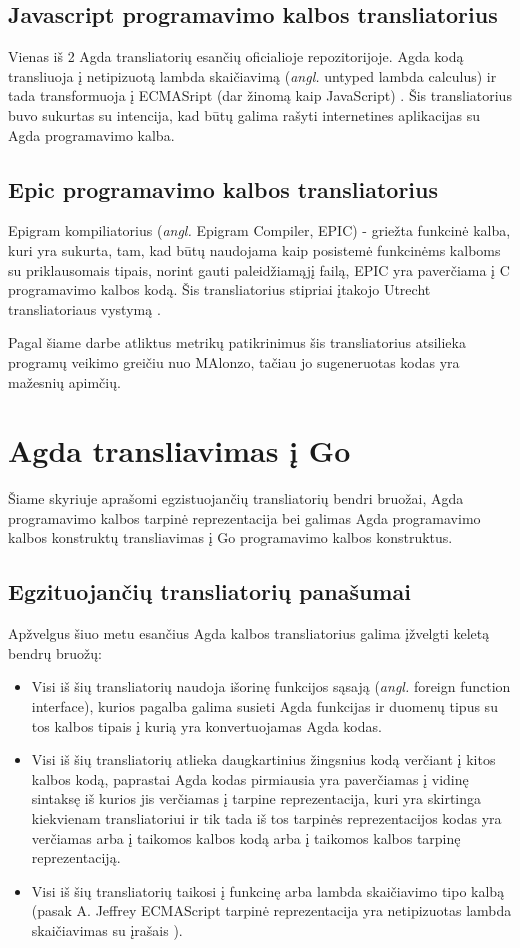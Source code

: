 \documentclass{VUMIFPSbakalaurinis}
\begin{document}
\subsection{Javascript programavimo kalbos transliatorius}
Vienas iš 2 Agda transliatorių esančių oficialioje repozitorijoje. Agda kodą transliuoja į netipizuotą lambda skaičiavimą (\textit{angl.} untyped lambda calculus) ir tada transformuoja į ECMASript (dar žinomą kaip JavaScript) \cite{html_agda}. Šis transliatorius buvo sukurtas su intencija, kad būtų galima rašyti internetines aplikacijas su Agda programavimo kalba.
\subsection{Epic programavimo kalbos transliatorius}
Epigram kompiliatorius (\textit{angl.} Epigram Compiler, EPIC) - griežta funkcinė kalba, kuri yra sukurta, tam, kad būtų naudojama kaip posistemė funkcinėms kalboms su priklausomais tipais, norint gauti paleidžiamąjį failą, EPIC yra paverčiama į C programavimo kalbos kodą. Šis transliatorius stipriai įtakojo Utrecht transliatoriaus vystymą \cite{Utrecht}.\par Pagal šiame darbe atliktus metrikų patikrinimus šis transliatorius atsilieka programų veikimo greičiu nuo MAlonzo, tačiau jo sugeneruotas kodas yra mažesnių apimčių. 
\section{Agda transliavimas į Go}
Šiame skyriuje aprašomi egzistuojančių transliatorių bendri bruožai, Agda programavimo kalbos tarpinė reprezentacija bei galimas Agda programavimo kalbos konstruktų transliavimas į Go programavimo kalbos konstruktus.
\subsection{Egzituojančių transliatorių panašumai}
Apžvelgus šiuo metu esančius Agda kalbos transliatorius galima įžvelgti keletą bendrų bruožų:
\begin{itemize}
	\item Visi iš šių transliatorių naudoja išorinę funkcijos sąsają (\textit{angl.} foreign function interface), kurios pagalba galima susieti Agda funkcijas ir duomenų tipus su tos kalbos tipais į kurią yra konvertuojamas Agda kodas.
	\item Visi iš šių transliatorių atlieka daugkartinius žingsnius kodą verčiant į kitos kalbos kodą, paprastai Agda kodas pirmiausia yra paverčiamas į vidinę sintaksę iš kurios jis verčiamas į tarpine reprezentacija, kuri yra skirtinga kiekvienam transliatoriui ir tik tada iš tos tarpinės reprezentacijos kodas yra verčiamas arba į taikomos kalbos kodą arba į taikomos kalbos tarpinę reprezentaciją.
	\item Visi iš šių transliatorių taikosi į funkcinę arba lambda skaičiavimo tipo kalbą (pasak A. Jeffrey ECMAScript tarpinė reprezentacija yra netipizuotas lambda skaičiavimas su įrašais \cite{html_agda}).
\end{itemize}
\end{document}
